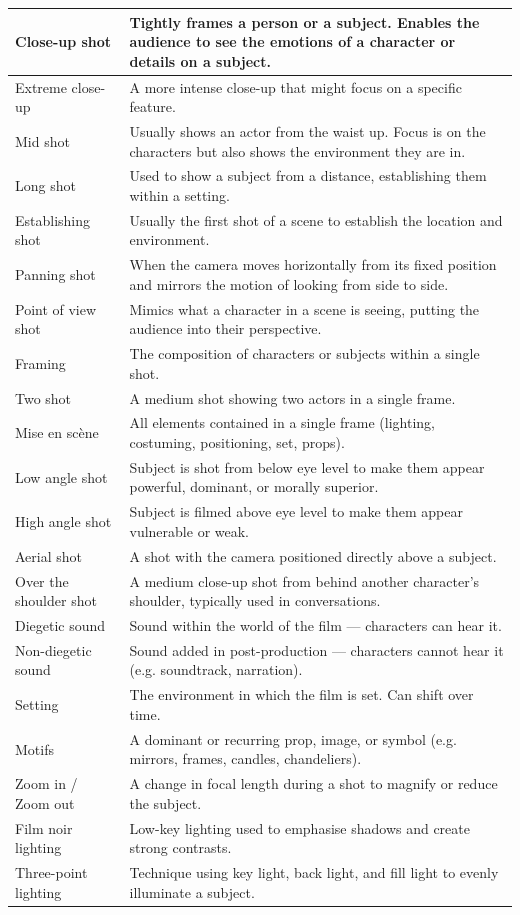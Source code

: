 \documentclass[a4paper]{article}
\begin{document}
\begin{longtable}{|p{5cm}|p{\dimexpr\linewidth-5cm-2\tabcolsep-2\arrayrulewidth}|}
Close-up shot & Tightly frames a person or a subject. Enables the audience to see the emotions of a character or details on a subject. \\
\hline
Extreme close-up & A more intense close-up that might focus on a specific feature. \\
\hline
Mid shot & Usually shows an actor from the waist up. Focus is on the characters but also shows the environment they are in. \\
\hline
Long shot & Used to show a subject from a distance, establishing them within a setting. \\
\hline
Establishing shot & Usually the first shot of a scene to establish the location and environment. \\
\hline
Panning shot & When the camera moves horizontally from its fixed position and mirrors the motion of looking from side to side. \\
\hline
Point of view shot & Mimics what a character in a scene is seeing, putting the audience into their perspective. \\
\hline
Framing & The composition of characters or subjects within a single shot. \\
\hline
Two shot & A medium shot showing two actors in a single frame. \\
\hline
Mise en scène & All elements contained in a single frame (lighting, costuming, positioning, set, props). \\
\hline
Low angle shot & Subject is shot from below eye level to make them appear powerful, dominant, or morally superior. \\
\hline
High angle shot & Subject is filmed above eye level to make them appear vulnerable or weak. \\
\hline
Aerial shot & A shot with the camera positioned directly above a subject. \\
\hline
Over the shoulder shot & A medium close-up shot from behind another character’s shoulder, typically used in conversations. \\
\hline
Diegetic sound & Sound within the world of the film — characters can hear it. \\
\hline
Non-diegetic sound & Sound added in post-production — characters cannot hear it (e.g. soundtrack, narration). \\
\hline
Setting & The environment in which the film is set. Can shift over time. \\
\hline
Motifs & A dominant or recurring prop, image, or symbol (e.g. mirrors, frames, candles, chandeliers). \\
\hline
Zoom in / Zoom out & A change in focal length during a shot to magnify or reduce the subject. \\
\hline
Film noir lighting & Low-key lighting used to emphasise shadows and create strong contrasts. \\
\hline
Three-point lighting & Technique using key light, back light, and fill light to evenly illuminate a subject. \\
\hline

\end{longtable}
\newpage
\end{document}
